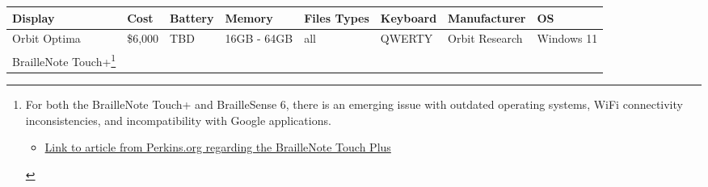 \documentclass[14pt, letterpaper,twoside]{extreport}
\begin{document}
\begin{longtable}[]{@{}
    >{\raggedright\arraybackslash}p{}
    >{\raggedright\arraybackslash}p{}
    >{\raggedright\arraybackslash}p{}
    >{\raggedright\arraybackslash}p{}
    >{\raggedright\arraybackslash}p{}
    >{\raggedright\arraybackslash}p{}
    >{\raggedright\arraybackslash}p{}
    >{\raggedright\arraybackslash}p{}@{}
    }
    \toprule\noalign{}
    
    \textbf{Display}                                                                                                                                                                                                                                             & \textbf{Cost} & \textbf{Battery} & \textbf{Memory} & \textbf{Files Types}   & \textbf{Keyboard} & \textbf{Manufacturer} & \textbf{OS}                                                                                                                                                                                                                                                                                                                                                                                 \\
    \midrule\noalign{}
    \endhead
    \bottomrule\noalign{}
    \endlastfoot
    Orbit Optima                                                                                                                                                                                                                                                 & \$6,000       & TBD              & 16GB - 64GB     & all                    & QWERTY            & Orbit Research        & Windows 11                                                                                                                                                                                                                                                                                                                                                                                  \\[1.0em]
    BrailleNote Touch+\footnote{For both the BrailleNote Touch+ and BrailleSense 6, there is an emerging issue with outdated operating systems, WiFi connectivity inconsistencies, and incompatibility with Google applications. \begin{itemize}
            \item
                  \href{https://perkins.org/braillenote-touch-outdated-os/}{Link to article from Perkins.org regarding the BrailleNote Touch Plus}

\end{itemize}}
\end{longtable}
\end{document}
